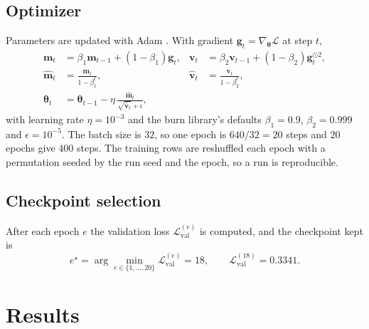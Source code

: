 \documentclass[11pt]{article}
\begin{document}
\subsection{Optimizer}

Parameters are updated with Adam \cite{kingma2015}. With gradient
$\bm{g}_t = \nabla_{\bm\theta}\mathcal{L}$ at step $t$,
\begin{align}
  \bm{m}_t &= \beta_1 \bm{m}_{t-1} + (1-\beta_1)\bm{g}_t, &
  \bm{v}_t &= \beta_2 \bm{v}_{t-1} + (1-\beta_2)\bm{g}_t^{\odot 2}, \\
  \hat{\bm{m}}_t &= \frac{\bm{m}_t}{1-\beta_1^t}, &
  \hat{\bm{v}}_t &= \frac{\bm{v}_t}{1-\beta_2^t}, \\
  \bm\theta_t &= \bm\theta_{t-1} - \eta \, \frac{\hat{\bm{m}}_t}{\sqrt{\hat{\bm{v}}_t} + \epsilon},
\end{align}
with learning rate $\eta = 10^{-3}$ and the burn library's defaults
$\beta_1 = 0.9$, $\beta_2 = 0.999$ and $\epsilon = 10^{-5}$. The batch size is
$32$, so one epoch is $640/32 = 20$ steps and $20$ epochs give $400$ steps. The
training rows are reshuffled each epoch with a permutation seeded by the run
seed and the epoch, so a run is reproducible.

\subsection{Checkpoint selection}

After each epoch $e$ the validation loss $\mathcal{L}_{\text{val}}^{(e)}$ is
computed, and the checkpoint kept is
\begin{equation}
  e^\star = \arg\min_{e \in \{1,\dots,20\}} \mathcal{L}_{\text{val}}^{(e)} = 18,
  \qquad \mathcal{L}_{\text{val}}^{(18)} = 0.3341.
\end{equation}

\section{Results}\label{sec:results}
\end{document}
